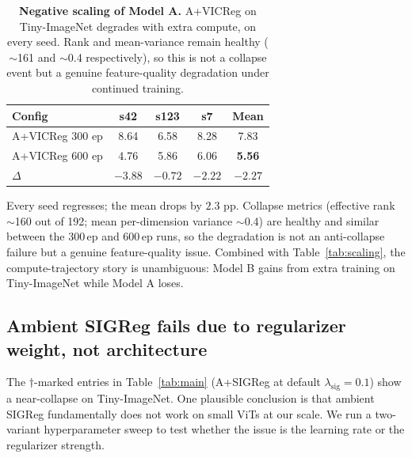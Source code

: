 \documentclass{article}
\begin{document}
\begin{table}[t]
  \centering
  \caption{\textbf{Negative scaling of Model A.} A+VICReg on Tiny-ImageNet degrades with extra compute, on every seed. Rank and mean-variance remain healthy ($\sim$161 and $\sim$0.4 respectively), so this is not a collapse event but a genuine feature-quality degradation under continued training.}
  \label{tab:negscale}
  \small
  \begin{tabular}{l c c c c}
    \toprule
    Config & s42 & s123 & s7 & Mean \\
    \midrule
    A+VICReg 300 ep & 8.64 & 6.58 & 8.28 & 7.83 \\
    A+VICReg 600 ep & 4.76 & 5.86 & 6.06 & \textbf{5.56} \\
    $\Delta$        & $-3.88$ & $-0.72$ & $-2.22$ & $\mathbf{-2.27}$ \\
    \bottomrule
  \end{tabular}
\end{table}

Every seed regresses; the mean drops by $2.3$ pp. Collapse metrics (effective rank $\sim$160 out of 192; mean per-dimension variance $\sim$0.4) are healthy and similar between the 300\,ep and 600\,ep runs, so the degradation is not an anti-collapse failure but a genuine feature-quality issue. Combined with Table~\ref{tab:scaling}, the compute-trajectory story is unambiguous: Model B gains from extra training on Tiny-ImageNet while Model A loses.

\subsection{Ambient SIGReg fails due to regularizer weight, not architecture}
\label{sec:results:sigfix}

The $\dagger$-marked entries in Table~\ref{tab:main} (A+SIGReg at default $\lambda_{\text{sig}}{=}0.1$) show a near-collapse on Tiny-ImageNet. One plausible conclusion is that ambient SIGReg fundamentally does not work on small ViTs at our scale. We run a two-variant hyperparameter sweep to test whether the issue is the learning rate or the regularizer strength.
\end{document}
